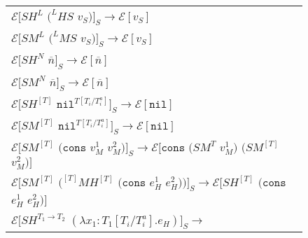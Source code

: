 \begin{figure}[p]
\centering
\begin{tabular}{l}
\vspace{5pt}

$\mathscr{E}[SH^{L}$ $(^{L}HS$ $v_{S})]_{S}\rightarrow\mathscr{E}[v_{S}]$ \\

\vspace{5pt}

$\mathscr{E}[SM^{L}$ $(^{L}MS$ $v_{S})]_{S}\rightarrow\mathscr{E}[v_{S}]$ \\

\vspace{5pt}

$\mathscr{E}[SH^{N}$ $\overline{n}]_{S}\rightarrow\mathscr{E}[\overline{n}]$ \\

\vspace{5pt}

$\mathscr{E}[SM^{N}$ $\overline{n}]_{S}\rightarrow\mathscr{E}[\overline{n}]$ \\

\vspace{5pt}

$\mathscr{E}[SH^{[T]}$ $\mathtt{nil}^{T[T_{i}/T_{i}^{a}]}]_{S}\rightarrow\mathscr{E}[\mathtt{nil}]$ \\

\vspace{5pt}

$\mathscr{E}[SM^{[T]}$ $\mathtt{nil}^{T[T_{i}/T_{i}^{a}]}]_{S}\rightarrow\mathscr{E}[\mathtt{nil}]$ \\

\vspace{5pt}

$\mathscr{E}[SM^{[T]}$ $(\mathtt{cons}$ $v_{M}^{1}$ $v_{M}^{2})]_{S}\rightarrow\mathscr{E}[\mathtt{cons}$ $(SM^{T}$ $v_{M}^{1})$ $(SM^{[T]}$ $v_{M}^{2})]$ \\

\vspace{5pt}

$\mathscr{E}[SM^{[T]}$ $(^{[T]}MH^{[T]}$ $(\mathtt{cons}$ $e_{H}^{1}$ $e_{H}^{2}))]_{S}\rightarrow\mathscr{E}[SH^{[T]}$ $(\mathtt{cons}$ $e_{H}^{1}$ $e_{H}^{2})]$ \\

\vspace{5pt}

$\mathscr{E}[SH^{T_{1}\rightarrow T_{2}}$ $(\lambda x_{1}:T_{1}[T_{i}/T_{i}^{a}].e_{H})]_{S}\rightarrow$ \\


\end{tabular}
\end{figure}

